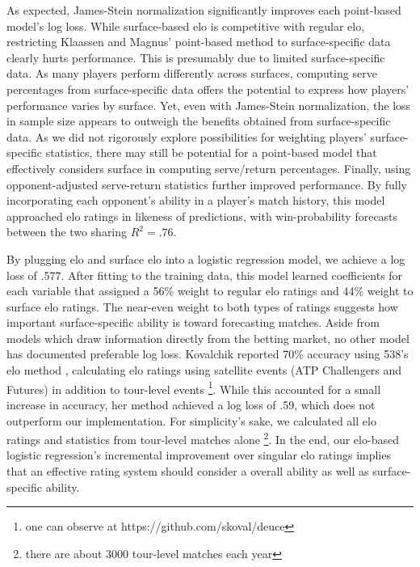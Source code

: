\documentclass[chapterprefix=false]{report}
\begin{document}
As expected, James-Stein normalization significantly improves each point-based model's log loss. While surface-based elo is competitive with regular elo, restricting Klaassen and Magnus' point-based method to surface-specific data clearly hurts performance. This is presumably due to limited surface-specific data. As many players perform differently across surfaces, computing serve percentages from surface-specific data offers the potential to express how players' performance varies by surface. Yet, even with James-Stein normalization, the loss in sample size appears to outweigh the benefits obtained from surface-specific data. As we did not rigorously explore possibilities for weighting players' surface-specific statistics, there may still be potential for a point-based model that effectively considers surface in computing serve/return percentages. Finally, using opponent-adjusted serve-return statistics further improved performance. By fully incorporating each opponent's ability in a player's match history, this model approached elo ratings in likeness of predictions, with win-probability forecasts between the two sharing $R^2=.76$.

By plugging elo and surface elo into a logistic regression model, we achieve a log loss of .577. After fitting to the training data, this model learned coefficients for each variable that assigned a 56\% weight to regular elo ratings and 44\% weight to surface elo ratings. The near-even weight to both types of ratings suggests how important surface-specific ability is toward forecasting matches. Aside from models which draw information directly from the betting market, no other model has documented preferable log loss. Kovalchik reported 70$\%$ accuracy using 538's elo method \cite{Kovalchik2016}, calculating elo ratings using satellite events (ATP Challengers and Futures) in addition to tour-level events \footnote{one can observe at https://github.com/skoval/deuce}. While this accounted for a small increase in accuracy, her method achieved a log loss of .59, which does not outperform our implementation. For simplicity's sake, we calculated all elo ratings and statistics from tour-level matches alone \footnote{there are about 3000 tour-level matches each year}. In the end, our elo-based logistic regression's incremental improvement over singular elo ratings implies that an effective rating system should consider a overall ability as well as surface-specific ability.


\end{document}

